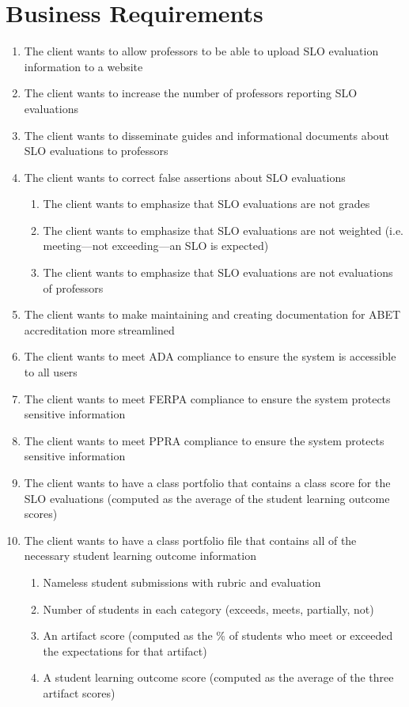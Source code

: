 \documentclass[a4paper,12pt]{article}
\begin{document}
\section*{Business Requirements}
\begin{enumerate}[label=BR\arabic*., ref=BR\arabic*]
\item The client wants to allow professors to be able to upload SLO evaluation information to a website
\item The client wants to increase the number of professors reporting SLO evaluations
\item The client wants to disseminate guides and informational documents about SLO evaluations to professors
\item The client wants to correct false assertions about SLO evaluations 
	\begin{enumerate}
	\item The client wants to emphasize that SLO evaluations are not grades
	\item The client wants to emphasize that SLO evaluations are not weighted (i.e. meeting---not exceeding---an SLO is expected)
	\item The client wants to emphasize that SLO evaluations are not evaluations of professors
	\end{enumerate}
\item The client wants to make maintaining and creating documentation for ABET accreditation more streamlined
\item The client wants to meet ADA compliance to ensure the system is accessible to all users
\item The client wants to meet FERPA compliance to ensure the system protects sensitive information
\item The client wants to meet PPRA compliance to ensure the system protects sensitive information
\item The client wants to have a class portfolio that contains a class score for the SLO evaluations (computed as the average of the student learning outcome scores)
\item The client wants to have a class portfolio file that contains all of the necessary student learning outcome information
	\begin{enumerate}
		\item Nameless student submissions with rubric and evaluation
		\item Number of students in each category (exceeds, meets, partially, not)
		\item An artifact score (computed as the \% of students who meet or exceeded the expectations for that artifact)
		\item A student learning outcome score (computed as the average of the three artifact scores)
	\end{enumerate}
\end{enumerate}
\end{document}
